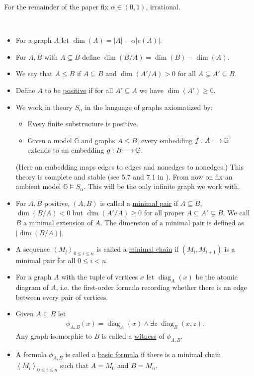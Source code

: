 \documentclass{amsart}
\newcommand{\GG}{\mathbb G}
\newcommand{\defn}{\underline}
\DeclareMathOperator{\diag}{diag}
\newcommand{\A}{A}
\newcommand{\B}{B}
\newcommand{\agl}[1]{\left\langle #1 \right\rangle}
\begin{document}
For the remainder of the paper fix $\alpha \in (0,1)$, irrational.
\begin{Definition} \ 
  \begin{itemize}
  \item For a graph $\A$ let $\dim(\A) = |\A| - \alpha |e(\A)|$.
  \item For $\A,\B$ with $\A \subseteq \B$ define $\dim(\B/\A) = \dim(\B) - \dim(\A)$.
  \item We say that $\A \leq \B$ if $\A \subseteq \B$ and $\dim(\A'/A) > 0$ for all $\A \subsetneq \A' \subseteq \B$.
  \item Define $\A$ to be \defn{positive} if for all $\A' \subseteq \A$ we have $\dim(\A') \geq 0$.
  \item We work in theory $S_\alpha$ in the language of graphs axiomatized by:
    \begin{itemize}
    \item Every finite substructure is positive.
    \item Given a model $\GG$ and graphs $\A \leq \B$, every embedding $f : \A \arr \GG$ extends to an embedding $g: \B \arr \GG$.
    \end{itemize}
    (Here an embedding maps edges to edges and nonedges to nonedges.)
    This theory is complete and stable (see 5.7 and 7.1 in \cite{laskowski}).
    From now on fix an ambient model $\GG \models S_\alpha$.
    This will be the only infinite graph we work with.
  \item For $\A, \B$ positive, $(\A, \B)$ is called a \defn{minimal pair} if
    $\A \subseteq \B$, $\dim(\B/\A) < 0$ but $\dim(\A'/\A) \geq 0$ for all proper $\A \subseteq \A' \subsetneq \B$.
    We call $B$ a \defn{minimal extension} of $A$.
    The dimension of a minimal pair is defined as $|\dim(B/A)|$.
  \item A sequence $\agl{M_i}_{0 \leq i \leq n}$ is called a \defn{minimal chain} if $(M_i, M_{i+1})$ is a minimal pair for all $0 \leq i < n$.
  \item For a graph $\A$ with the tuple of vertices $x$ let $\diag_\A(x)$ be the atomic diagram of $\A$,
    i.e. the first-order formula recording whether there is an edge between every pair of vertices.
  \item Given $\A \subseteq \B$ let 
    \begin{align*}
      \phi_{\A,\B}(x) = \diag_\A(x) \wedge \exists z \; \diag_\B(x, z).
    \end{align*}
    Any graph isomorphic to $\B$ is called a \defn{witness} of $\phi_{A,B}$.
  \item A formula $\phi_{A,B}$ is called a \defn{basic formula}
    if there is a minimal chain $\agl{M_i}_{0 \leq i \leq n}$
    such that $A = M_0$ and $B = M_n$.
  \end{itemize}
\end{Definition}
\end{document}
